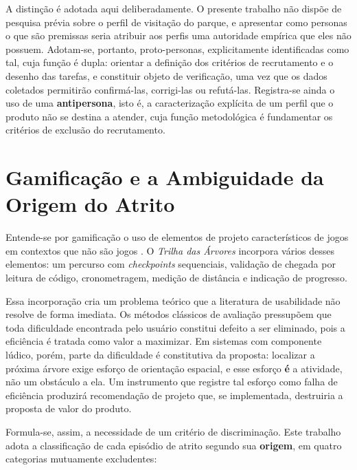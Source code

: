 A distinção é adotada aqui deliberadamente. O presente trabalho não dispõe de
pesquisa prévia sobre o perfil de visitação do parque, e apresentar como personas
o que são premissas seria atribuir aos perfis uma autoridade empírica que eles não
possuem. Adotam-se, portanto, proto-personas, explicitamente identificadas como
tal, cuja função é dupla: orientar a definição dos critérios de recrutamento e o
desenho das tarefas, e constituir objeto de verificação, uma vez que os dados
coletados permitirão confirmá-las, corrigi-las ou refutá-las. Registra-se ainda o
uso de uma \textbf{antipersona}, isto é, a caracterização explícita de um perfil
que o produto não se destina a atender, cuja função metodológica é fundamentar os
critérios de exclusão do recrutamento.

\section{Gamificação e a Ambiguidade da Origem do Atrito}
\label{sec:gamificacao}

Entende-se por gamificação o uso de elementos de projeto característicos de jogos
em contextos que não são jogos \cite{deterding2011}. O \textit{Trilha das
Árvores} incorpora vários desses elementos: um percurso com \textit{checkpoints}
sequenciais, validação de chegada por leitura de código, cronometragem, medição de
distância e indicação de progresso.

Essa incorporação cria um problema teórico que a literatura de usabilidade não
resolve de forma imediata. Os métodos clássicos de avaliação pressupõem que toda
dificuldade encontrada pelo usuário constitui defeito a ser eliminado, pois a
eficiência é tratada como valor a maximizar. Em sistemas com componente lúdico,
porém, parte da dificuldade é constitutiva da proposta: localizar a próxima árvore
exige esforço de orientação espacial, e esse esforço \textbf{é} a atividade, não um
obstáculo a ela. Um instrumento que registre tal esforço como falha de eficiência
produzirá recomendação de projeto que, se implementada, destruiria a proposta de
valor do produto.

Formula-se, assim, a necessidade de um critério de discriminação. Este trabalho
adota a classificação de cada episódio de atrito segundo sua \textbf{origem}, em
quatro categorias mutuamente excludentes:

